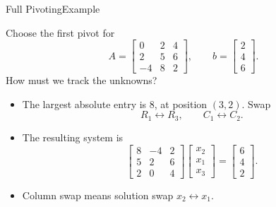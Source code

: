 \documentclass[10pt]{beamer}
\begin{document}
\begin{frame}{Full Pivoting}{Example}

\begin{example}
Choose the first pivot for
\[
A=
\begin{bmatrix}
    0&2&4\\
    2&5&6\\
    -4&8&2
\end{bmatrix},
\qquad
b=
\begin{bmatrix}
    2\\4\\6
\end{bmatrix}.
\]
How must we track the unknowns?
\end{example}

\begin{itemize}
    \item The largest absolute entry is $8$, at
    position $(3,2)$. Swap
    \[
        R_1\leftrightarrow R_3,
        \qquad C_1\leftrightarrow C_2.
    \]

    \item The resulting system is
    \[
    \begin{bmatrix}
        \boxed{8}&-4&2\\
        5&2&6\\
        2&0&4
    \end{bmatrix}
    \begin{bmatrix}
        x_2\\x_1\\x_3
    \end{bmatrix}
    =
    \begin{bmatrix}
        6\\4\\2
    \end{bmatrix}.
    \]

    \item Column swap means solution swap $x_2\leftrightarrow x_1$.
\end{itemize}

\end{frame}

\end{document}
